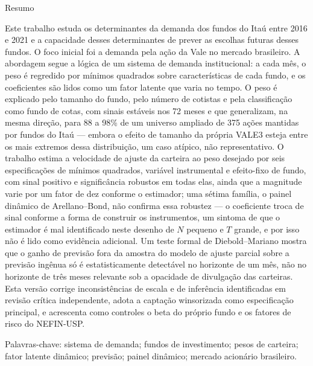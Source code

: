 \documentclass[12pt,a4paper]{article}
\begin{document}
\thispagestyle{fancy}
\begin{center}{\large Resumo}\end{center}
\noindent
Este trabalho estuda os determinantes da demanda dos fundos do Itaú entre 2016 e 2021 e a
capacidade desses determinantes de prever as escolhas futuras desses fundos. O foco inicial
foi a demanda pela ação da Vale no mercado brasileiro. A abordagem segue a lógica de um
sistema de demanda institucional: a cada mês, o peso é regredido por mínimos quadrados sobre
características de cada fundo, e os coeficientes são lidos como um fator latente que varia no
tempo. O peso é explicado pelo tamanho do fundo, pelo número de cotistas e pela classificação
como fundo de cotas, com sinais estáveis nos 72 meses e que generalizam, na mesma direção,
para 88 a 98\% de um universo ampliado de 375 ações mantidas por fundos do Itaú --- embora o
efeito de tamanho da própria VALE3 esteja entre os mais extremos dessa distribuição, um caso
atípico, não representativo. O trabalho estima a velocidade de ajuste da carteira ao peso desejado por seis especificações de
mínimos quadrados, variável instrumental e efeito-fixo de fundo, com sinal positivo e
significância robustos em todas elas, ainda que a magnitude varie por um fator de dez conforme o
estimador; uma sétima família, o painel dinâmico de Arellano--Bond, não confirma essa robustez
--- o coeficiente troca de sinal conforme a forma de construir os instrumentos, um sintoma de que
o estimador é mal identificado neste desenho de $N$ pequeno e $T$ grande, e por isso não é lido
como evidência adicional. Um teste formal de Diebold--Mariano mostra que o ganho de previsão fora
da amostra do modelo de ajuste parcial sobre a previsão ingênua só é estatisticamente detectável
no horizonte de um mês, não no horizonte de três meses relevante sob a opacidade de divulgação
das carteiras. Esta versão corrige inconsistências de escala e de inferência identificadas em
revisão crítica independente, adota a captação winsorizada como especificação principal, e
acrescenta como controles o beta do próprio fundo e os fatores de risco do NEFIN-USP.

\smallskip
\noindent Palavras-chave: sistema de demanda; fundos de investimento; pesos de carteira;
fator latente dinâmico; previsão; painel dinâmico; mercado acionário brasileiro.
\end{document}
